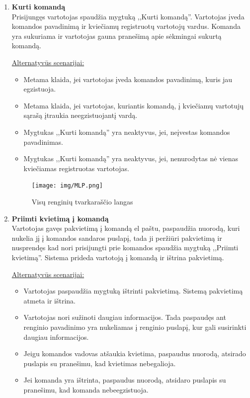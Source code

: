 \documentclass{VUMIFPSkursinis}
\begin{document}
\begin{enumerate} [label = \textbf{U\arabic*.}]
				\begin{figure}[H]
					\centering
					\texttt{[image: img/MLP.png]}
					\caption{Prašymo dalyvauti privačiame renginyje langas}
					\label{fig:prasymas-dalyvauti-privaciame-renginyje}
				\end{figure}
				
			\item \textbf{Kurti komandą} \\
				Prisijungęs vartotojas spaudžia mygtuką ,,Kurti komandą''. Vartotojas įveda komandos pavadinimą ir kviečiamų registruotų vartotojų vardus. Komanda yra sukuriama ir vartotojas gauna pranešimą apie sėkmingai sukurtą komandą.
			
				\underline{Alternatyvūs scenarijai:}
				\begin{itemize}
					\item Metama klaida, jei vartotojas įveda komandos pavadinimą, kuris jau egzistuoja.
					\item Metama klaida, jei vartotojas, kuriantis komandą, į kviečiamų vartotujų sąrašą įtraukia neegzistuojantį vardą.
					\item Mygtukas ,,Kurti komandą'' yra neaktyvus, jei, neįvestas komandos pavadinimas.
					\item Mygtukas ,,Kurti komandą'' yra neaktyvus, jei, nenurodytas nė vienas kviečiamas registruotas vartotojas.
				\end{itemize}

				\begin{figure}[H]
					\centering
					\texttt{[image: img/MLP.png]}
					\caption{Visų renginių tvarkaraščio langas}
					\label{fig:perziureti-renginiu-tvarkarasti}
				\end{figure}

			\item \textbf{Priimti kvietimą į komandą} \\
					Vartotojas gavęs pakvietimą į komandą el paštu, paspaudžia nuorodą, kuri nukelia jį į komandos sandaros puslapį, tada ji peržiūri pakvietimą ir nusprendęs kad nori prisijungti prie komandos spaudžia mygtuką ,,Priimti kvietimą''. Sistema prideda vartotoją į komandą ir ištrina pakvietimą.

				\underline{Alternatyvūs scenarijai:}
				\begin{itemize}
					\item Vartotojas paspaudžia mygtuką ištrinti pakvietimą. Sistemą pakvietimą atmeta ir ištrina.
					\item Vartotojas nori sužinoti daugiau informacijos. Tada paspaudęs ant renginio pavadinimo yra nukeliamas į renginio puslapį, kur gali susirinkti daugiau informacijos.
					\item Jeigu komandos vadovas atšaukia kvietima, paspaudus nuorodą, atsirado puslapis su pranešimu, kad kvietimas nebegalioja.
					\item Jei komanda yra ištrinta, paspaudus nuorodą, atsidaro puslapis su pranešimu, kad komanda nebeegzistuoja.
				\end{itemize}


\end{enumerate}
\end{document}
